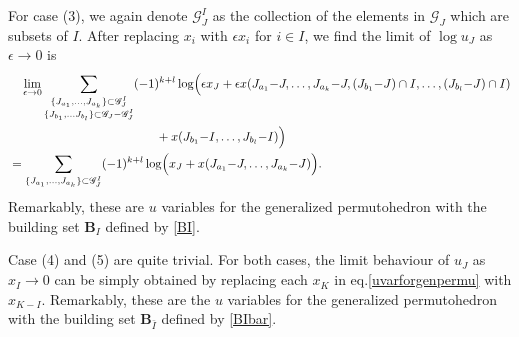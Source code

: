 \documentclass[hidelinks,12pt]{article}
\begin{document}
For case (3), we again denote $\mathscr{G}^{I}_{J}$ as the collection of the elements in $\mathscr{G}_{J}$ which are subsets of $ I$. After replacing $x_{i}$ with $\epsilon x_{i}$ for $i\in I$, we find the limit of $\log u_{J}$ as $\epsilon \to 0$ is
\begin{align}
  &\quad \lim_{\epsilon\to 0}  \sum_{\substack {\{J_{a_{1}},\ldots,J_{a_{k}}\}\subset \mathscr{G}^{I}_{J}\\ \{J_{b_{1}},\ldots J_{b_{l}}\}\subset \mathscr{G}_{J}-\mathscr{G}^{I}_{J}}}(-1)^{k+l}\log\Bigl( \epsilon x_{J}+\epsilon x(J_{a_{1}}{-}J,\ldots,J_{a_{k}}{-}J,(J_{b_{1}}{-}J)\cap I,\ldots, (J_{b_{l}}{-}J)\cap I) \nonumber \\
  & \qquad \qquad\qquad \qquad \qquad \qquad    + x (J_{b_{1}}{-}I,\ldots,J_{b_{l}}{-}I)\Bigr) \nonumber  \\
  &=\sum_{\{J_{a_{1}},\ldots,J_{a_{k}}\}\subset \mathscr{G}_{J}^{I}} (-1)^{k+l}\log\Bigl( x_{J}+ x(J_{a_{1}}{-}J,\ldots,J_{a_{k}}{-}J) \Bigr). 
\end{align}
Remarkably, these are $u$ variables for the generalized permutohedron with the building set $\mathbf{B}_{I}$ defined by \eqref{BI}.

Case (4) and (5) are quite trivial. For both cases, the limit behaviour of $u_{J}$ as $x_{I}\to 0$ can be simply obtained by replacing each $x_{K}$ in eq.\eqref{uvarforgenpermu} with $x_{K-I}$. %
Remarkably, these are the $u$ variables for the generalized permutohedron with the building set $ \mathbf{B}_{\bar{I}}$ defined by \eqref{BIbar}.
\end{document}
